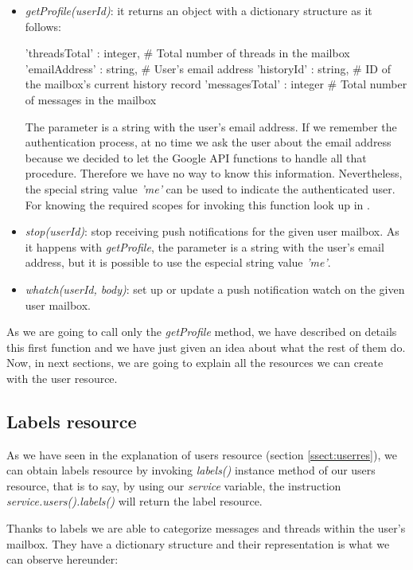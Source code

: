 \begin{itemize}
	\item\textit{getProfile(userId)}: it returns an object with a dictionary structure as it follows:
	\begin{python}
	{
	'threadsTotal' : integer, # Total number of threads in the mailbox
	'emailAddress' : string, # User's email address
	'historyId' : string, # ID of the mailbox's current history record
	'messagesTotal' : integer # Total number of messages in the mailbox
	}
	\end{python}
	The parameter is a string with the user's email address. If we remember the authentication process, at no time we ask the user about the email address because we decided to let the Google API functions to handle all that procedure. Therefore we have no way to know this information. Nevertheless, the special string value \textit{'me'} can be used to indicate the authenticated user. For knowing the required scopes for invoking this function look up in \cite[/v1/reference/users/getProfile]{gmailAPI}.
	\item\textit{stop(userId)}: stop receiving push notifications for the given user mailbox. As it happens with \textit{getProfile}, the parameter is a string with the user's email address, but it is possible to use the especial string value \textit{'me'}.
	\item\textit{whatch(userId, body)}: set up or update a push notification watch on the given user mailbox.
\end{itemize}

As we are going to call only the \textit{getProfile} method, we have described on details this first function and we have just given an idea about what the rest of them do. Now, in next sections, we are going to explain all the resources we can create with the user resource.

\subsection{Labels resource}\label{ssect:labres}
As we have seen in the explanation of users resource (section \ref{ssect:userres}), we can obtain labels resource \citep[/v1/reference/users/labels]{gmailAPI} by invoking \textit{labels()} instance method of our users resource, that is to say, by using our \textit{service} variable, the instruction \textit{service.users().labels()} will return the label resource.

Thanks to labels we are able to categorize messages and threads within the user's mailbox. They have a dictionary structure and their representation is what we can observe hereunder:

